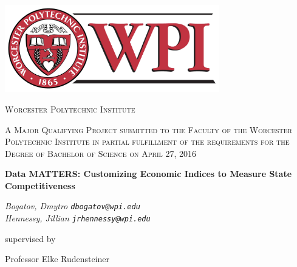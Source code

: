 \begin{titlepage}
	\centering
	
	
    \includegraphics[width=0.7\textwidth]{images/wpiLogo.png}\par\vspace{0.0cm}
	
    {\scshape\Large Worcester Polytechnic Institute \par}
	\vspace{0.5cm}
	
    {\scshape\large
		A Major Qualifying Project submitted to the Faculty of the 
		Worcester Polytechnic Institute in partial fulfillment of 
		the requirements for the Degree of Bachelor of Science on April 27, 2016 
	\par}
	\vspace{0.5cm}
	
    {\LARGE\bfseries Data MATTERS: Customizing Economic Indices to Measure State Competitiveness \par}
	\vspace{1cm}
	
    {\large\itshape 
        Bogatov, Dmytro \texttt{dbogatov@wpi.edu} \\
        Hennessy, Jillian \texttt{jrhennessy@wpi.edu}
     \par}
	\vfill
	
    supervised by\par
	Professor Elke Rudensteiner

	\vfill
    
\end{titlepage}